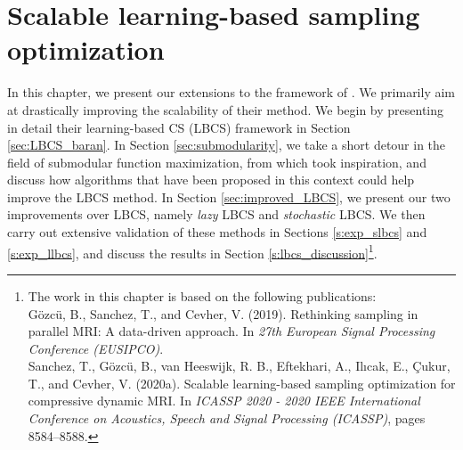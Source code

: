 \chapter{Scalable learning-based sampling optimization}\label{chap:lbcs}
In this chapter, we present our extensions to the framework of \citet{gozcu2018learning}. We primarily aim at drastically improving the scalability of their method. We begin by presenting in detail their learning-based CS (LBCS) framework in Section \ref{sec:LBCS_baran}. In Section \ref{sec:submodularity}, we take a short detour in the field of submodular function maximization, from which \citet{gozcu2018learning} took inspiration, and discuss how algorithms that have been proposed in this context could help improve the LBCS method. In Section \ref{sec:improved_LBCS}, we present our two improvements over LBCS, namely \textit{lazy} LBCS and \textit{stochastic} LBCS. We then carry out extensive validation of these methods in Sections \ref{s:exp_slbcs} and \ref{s:exp_llbcs}, and discuss the results in Section \ref{s:lbcs_discussion}\footnote{The work in this chapter is based on the following publications:\\
G{\"o}zc{\"u}, B., Sanchez, T., and Cevher, V. (2019). Rethinking sampling in parallel MRI: A data-driven approach. In \textit{27th European Signal Processing Conference (EUSIPCO)}.\\
Sanchez, T., G{\"o}zc{\"u}, B., van Heeswijk, R. B., Eftekhari, A., Il{\i}cak, E., \c{C}ukur, T., and Cevher, V. (2020a). Scalable learning-based sampling optimization for compressive dynamic MRI. In \textit{ICASSP 2020 - 2020 IEEE International Conference on Acoustics, Speech and Signal Processing (ICASSP)}, pages 8584–8588.}.


